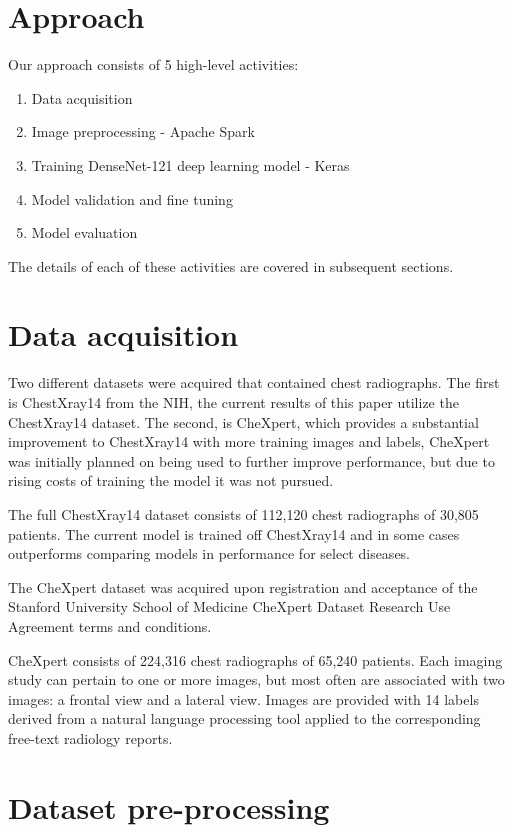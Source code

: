 \documentclass{amia}
\begin{document}
\section*{Approach}

Our approach consists of 5 high-level activities:
\begin{enumerate}
\item Data acquisition
\item Image preprocessing - Apache Spark
\item Training DenseNet-121 deep learning model - Keras
\item Model validation and fine tuning
\item Model evaluation
\end{enumerate}

The details of each of these activities are covered in subsequent sections.

\section*{Data acquisition}
Two different datasets were acquired that contained chest radiographs. The first is ChestXray14 from the NIH, the current results of this paper utilize the ChestXray14 dataset. The second, is CheXpert, which provides a substantial improvement to ChestXray14 with more training images and labels, CheXpert was initially planned on being used to further improve performance, but due to rising costs of training the model it was not pursued.

The full ChestXray14 dataset consists of 112,120 chest radiographs of 30,805 patients. The current model is trained off ChestXray14 and in some cases outperforms comparing models in performance for select diseases.

The CheXpert dataset was acquired upon registration and acceptance of the Stanford University School of Medicine CheXpert Dataset Research Use Agreement terms and conditions.\cite{ref2}

CheXpert consists of 224,316 chest radiographs of 65,240 patients. Each imaging study can pertain to one or more images, but most often are associated with two images: a frontal view and a lateral view. Images are provided with 14 labels derived from a natural language processing tool applied to the corresponding free-text radiology reports.


\section*{Dataset pre-processing}
\end{document}
